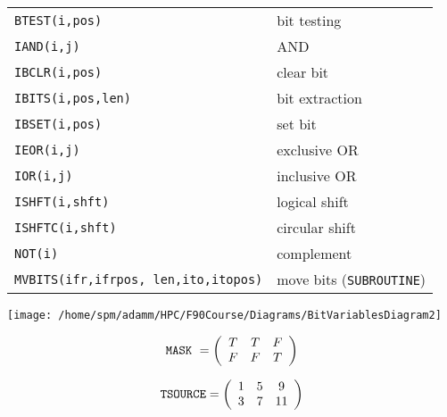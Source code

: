 \documentclass{article}
\begin{document}
{\newpage
\clearpage
\samepage \begin{figure}[H]
\begin{center}
{}

\end{center}
\end{figure}
}

{\newpage
\clearpage
\samepage \begin{tabular}{|p{2.5in}|p{2.5in}|}\hline
{\tt BTEST}{\tt (i,pos)}	& bit testing \\  
{\tt IAND}{\tt (i,j)}	& AND \\  
{\tt IBCLR}{\tt (i,pos)}	& clear bit \\  
{\tt IBITS}{\tt (i,pos,len)}& bit extraction\\  
{\tt IBSET}{\tt (i,pos)}	& set bit \\  
{\tt IEOR}{\tt (i,j)}	& exclusive OR \\  
{\tt IOR}{\tt (i,j)}	& inclusive OR \\  
{\tt ISHFT}{\tt (i,shft)}	& logical shift \\  
{\tt ISHFTC}{\tt (i,shft)}	& circular shift \\  
{\tt NOT}{\tt (i)}		& complement \\ \hline
{\tt MVBITS}{\tt (ifr,ifrpos, len,ito,itopos)}& move bits ({\tt SUB\-ROUTINE}) \\ \hline
\end{tabular}
}

{\newpage
\clearpage
\samepage \texttt{[image: /home/spm/adamm/HPC/F90Course/Diagrams/BitVariablesDiagram2]}
}

{\newpage
\clearpage
\samepage \begin{displaymath}{\tt MASK}{}\ =
\left(
\begin{array}{ccc}
T &  T &  F \\  
F &  F &  T
\end{array}
\right)
\end{displaymath}
}

{\newpage
\clearpage
\samepage \begin{displaymath}{\tt TSOURCE} = 
\left(
\begin{array}{ccc}
1 & 5 & 9 \\  
3 & 7 & 11
\end{array}
\right)
\end{displaymath}
}
\end{document}
